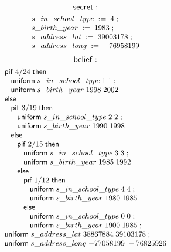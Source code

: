 $$ \mathsf{secret}: $$
\begin{displaymath}{\small
\begin{array}{l}
  {s\text{\_}in\text{\_}school\text{\_}type}\;:=\;{4}\; ;\\
  {s\text{\_}birth\text{\_}year}\;:=\;{1983}\; ;\\
  {s\text{\_}address\text{\_}lat}\;:=\;{39003178}\; ;\\
  {s\text{\_}address\text{\_}long}\;:=\;{-76958199}\\
\end{array}
}
\end{displaymath}
$$ \mathsf{belief}: $$
\begin{displaymath}{\small
\begin{array}{l}
  \mathsf{pif}\; 4/24 \; \mathsf{then}\\
  \;\;\;\mathsf{uniform}\;{s\text{\_}in\text{\_}school\text{\_}type}\;{1}\;1\; ;\\
  \;\;\;\mathsf{uniform}\;{s\text{\_}birth\text{\_}year}\;{1998}\;2002\\
  \mathsf{else}\\
  \;\;\;\mathsf{pif}\; 3/19 \; \mathsf{then}\\
  \;\;\;\;\;\;\mathsf{uniform}\;{s\text{\_}in\text{\_}school\text{\_}type}\;{2}\;2\; ;\\
  \;\;\;\;\;\;\mathsf{uniform}\;{s\text{\_}birth\text{\_}year}\;{1990}\;1998\\
  \;\;\;\mathsf{else}\\
  \;\;\;\;\;\;\mathsf{pif}\; 2/15 \; \mathsf{then}\\
  \;\;\;\;\;\;\;\;\;\mathsf{uniform}\;{s\text{\_}in\text{\_}school\text{\_}type}\;{3}\;3\; ;\\
  \;\;\;\;\;\;\;\;\;\mathsf{uniform}\;{s\text{\_}birth\text{\_}year}\;{1985}\;1992\\
  \;\;\;\;\;\;\mathsf{else}\\
  \;\;\;\;\;\;\;\;\;\mathsf{pif}\; 1/12 \; \mathsf{then}\\
  \;\;\;\;\;\;\;\;\;\;\;\;\mathsf{uniform}\;{s\text{\_}in\text{\_}school\text{\_}type}\;{4}\;4\; ;\\
  \;\;\;\;\;\;\;\;\;\;\;\;\mathsf{uniform}\;{s\text{\_}birth\text{\_}year}\;{1980}\;1985\\
  \;\;\;\;\;\;\;\;\;\mathsf{else}\\
  \;\;\;\;\;\;\;\;\;\;\;\;\mathsf{uniform}\;{s\text{\_}in\text{\_}school\text{\_}type}\;{0}\;0\; ;\\
  \;\;\;\;\;\;\;\;\;\;\;\;\mathsf{uniform}\;{s\text{\_}birth\text{\_}year}\;{1900}\;1985\; ;\\
  \mathsf{uniform}\;{s\text{\_}address\text{\_}lat}\;{38867884}\;39103178\; ;\\
  \mathsf{uniform}\;{s\text{\_}address\text{\_}long}\;{-77058199}\;-76825926\\
\end{array}
}
\end{displaymath}

